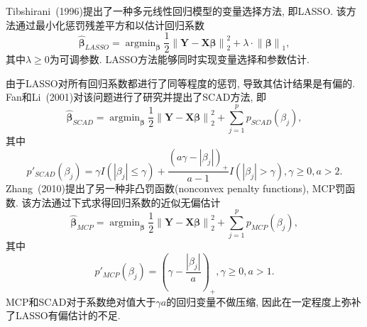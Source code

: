 \documentclass[a4paper,12pt,openany,oneside,utf-8]{ctexbook}
\begin{document}
Tibshirani~(1996)提出了一种多元线性回归模型的变量选择方法, 即LASSO. 该方法通过最小化惩罚残差平方和以估计回归系数
\begin{equation*}
  \bm{\widehat{\beta}}_{LASSO}=\mathop{\arg\min}_{\bm{\beta}} \frac{1}{2} \left \| \bm{Y}-\bm{X}\bm{\beta} \right \|_2^2+\lambda \cdot \left \| \bm{\beta} \right \|_1,
\end{equation*}
其中$\lambda \geq 0$为可调参数. LASSO方法能够同时实现变量选择和参数估计.

由于LASSO对所有回归系数都进行了同等程度的惩罚, 导致其估计结果是有偏的. Fan和Li~(2001)对该问题进行了研究并提出了SCAD方法, 即
\begin{equation*}
  \bm{\widehat{\beta}}_{SCAD}=\mathop{\arg\min}_{\bm{\beta}} \frac{1}{2} \left \| \bm{Y}-\bm{X}\bm{\beta} \right \|_2^2+\sum_{j=1}^{p}p_{SCAD}(\beta_j),
\end{equation*}
其中
\begin{equation*}
  {p}'_{SCAD}(\beta_j)=\gamma I(\left | \beta_j \right | \leq \gamma) + \frac{(a\gamma-\left | \beta_j \right |)_{+}}{a-1} I(\left | \beta_j \right | > \gamma), \gamma \geq 0, a>2.
\end{equation*}
Zhang~(2010)提出了另一种非凸罚函数(nonconvex penalty functions), MCP罚函数. 该方法通过下式求得回归系数的近似无偏估计
\begin{equation*}
  \bm{\widehat{\beta}}_{MCP}=\mathop{\arg\min}_{\bm{\beta}} \frac{1}{2} \left \| \bm{Y}-\bm{X}\bm{\beta} \right \|_2^2+\sum_{j=1}^{p}p_{MCP}(\beta_j),
\end{equation*}
其中
\begin{equation*}
  {p}'_{MCP}(\beta_j)=(\gamma- \frac{\left | \beta_j \right |}{a})_{+}, \gamma \geq 0, a>1.
\end{equation*}
MCP和SCAD对于系数绝对值大于$\gamma a$的回归变量不做压缩, 因此在一定程度上弥补了LASSO有偏估计的不足.
\end{document}
